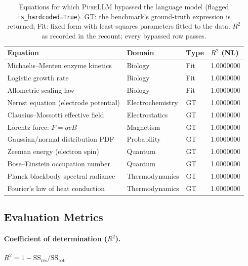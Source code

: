 \documentclass[twoside,11pt]{article}
\newcommand{\PureLLM}{\textsc{PureLLM}}
\newcommand{\Rsq}{R^{2}}
\begin{document}
\begin{table}[ht]
\centering
\caption{Equations for which \PureLLM{} bypassed the language model (flagged \texttt{is\_hardcoded=True}).
  GT: the benchmark's ground-truth expression is returned; Fit: fixed form with least-squares parameters fitted to the data.
  $\Rsq$ as recorded in the recount; every bypassed row passes.}
\label{tab:hardcoded}
\small
\begin{tabular}{L{5.4cm} L{3.0cm} C{1.0cm} C{1.7cm}}
\toprule
\textbf{Equation} & \textbf{Domain} & \textbf{Type} & \textbf{$\Rsq$ (NL)} \\
\midrule
Michaelis--Menten enzyme kinetics       & Biology          & Fit & 1.0000000 \\
Logistic growth rate                    & Biology          & Fit & 1.0000000 \\
Allometric scaling law                  & Biology          & Fit & 1.0000000 \\
Nernst equation (electrode potential)   & Electrochemistry & GT  & 1.0000000 \\
Clausius--Mossotti effective field      & Electrostatics   & GT  & 1.0000000 \\
Lorentz force: $F = qvB$                & Magnetism        & GT  & 1.0000000 \\
Gaussian/normal distribution PDF        & Probability      & GT  & 1.0000000 \\
Zeeman energy (electron spin)           & Quantum          & GT  & 1.0000000 \\
Bose--Einstein occupation number        & Quantum          & GT  & 1.0000000 \\
Planck blackbody spectral radiance      & Thermodynamics   & GT  & 1.0000000 \\
Fourier's law of heat conduction        & Thermodynamics   & GT  & 1.0000000 \\
\bottomrule
\end{tabular}
\end{table}

\subsection{Evaluation Metrics}
\label{sec:methods:metrics}

\paragraph{Coefficient of determination ($\Rsq$).}
$\Rsq = 1 - \mathrm{SS}_{\mathrm{res}} / \mathrm{SS}_{\mathrm{tot}}$.
\end{document}
